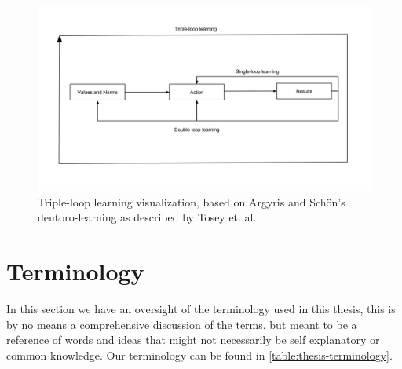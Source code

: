 \begin{figure}[!h]
	\centering
	\includegraphics[width=\textwidth, keepaspectratio]{figures/triple-loop.png}
	\caption{Triple-loop learning visualization, based on Argyris and Schön's deutoro-learning as described by Tosey et. al. \cite{Tosey2011}}
	\label{figure:triple-loop}
\end{figure}

\clearpage 

\section{Terminology}
In this section we have an oversight of the terminology used in this thesis, this is by no means a comprehensive discussion of the terms, but meant to be a reference of words and ideas that might not necessarily be self explanatory or common knowledge. Our terminology can be found in \autoref{table:thesis-terminology}.

